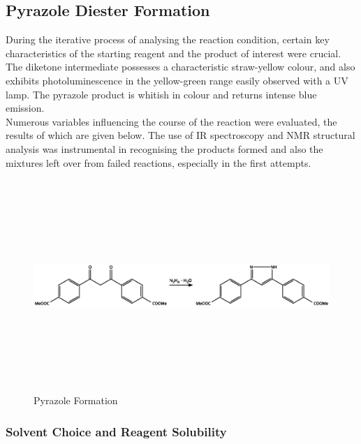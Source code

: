 \documentclass[../Master.tex]{subfiles}
\begin{document}
\subsection{Pyrazole Diester Formation}\label{sec:pyrazole-diester}

During the iterative process of analysing the reaction condition, certain key characteristics of the starting reagent and the product of interest were crucial. The diketone intermediate possesses a characteristic straw-yellow colour, and also exhibits photoluminescence in the yellow-green range easily observed with a UV lamp. The pyrazole product is whitish in colour and returns intense blue emission.\\
Numerous variables influencing the course of the reaction were evaluated, the results of which are given below. The use of IR spectroscopy and NMR structural analysis was instrumental in recognising the products formed and also the mixtures left over from failed reactions, especially in the first attempts.

\begin{figure}[h!]
	\centering
	\includegraphics[width=13cm,height=8cm,keepaspectratio]{Structures/pyrazole-form.eps}
	\caption{Pyrazole Formation}\label{fig:pyrazole-form}
\end{figure}

\subsubsection{Solvent Choice and Reagent Solubility}\label{sec:solvent}
\end{document}
